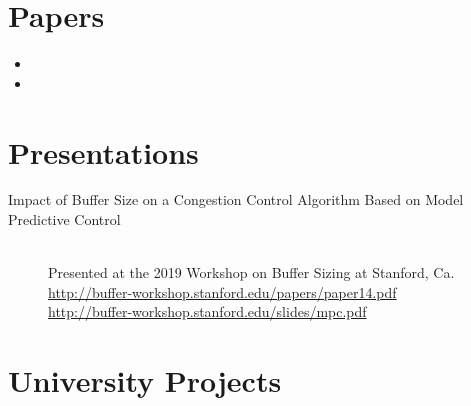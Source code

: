 \documentclass[11pt,a4paper]{moderncv}
\begin{document}
\section*{Papers}

\begin{itemize}
\item {}

\item {}
\end{itemize}

\section*{Presentations}

\begin{description}
    \item[Impact of Buffer Size on a Congestion Control Algorithm Based on Model Predictive Control]
        \hfill\\
        Presented at the 2019 Workshop on Buffer Sizing at Stanford, Ca.\\
        \url{http://buffer-workshop.stanford.edu/papers/paper14.pdf}\\
        \url{http://buffer-workshop.stanford.edu/slides/mpc.pdf}
\end{description}


\section*{University Projects}
\end{document}
